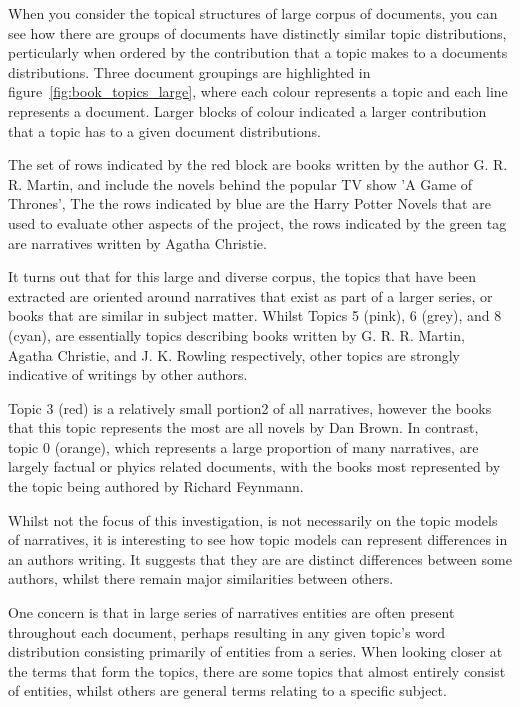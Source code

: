 \documentclass[10pt]{report}
\begin{document}
\begin{multicols}{2}
  \columnbreak
  
  When you consider the topical structures of large corpus of documents, you can see how there are  groups of documents have distinctly similar topic distributions, perticularly when ordered by the contribution that a topic makes to a documents distributions. Three document groupings are highlighted in figure~\ref{fig:book_topics_large}, where each colour represents a topic and each line represents a document. Larger blocks of colour indicated a larger contribution that a topic has to a given document distributions.

  The set of rows indicated by the red block are books written by the author G. R. R. Martin, and include the novels behind the popular TV show 'A Game of Thrones', The the rows indicated by blue are the Harry Potter Novels that are used to evaluate other aspects of the project, the rows indicated by the green tag are narratives written by Agatha Christie.

It turns out that for this large and diverse corpus, the topics that have been extracted are oriented around narratives that exist as part of a larger series, or books that are similar in subject matter. Whilst Topics 5 (pink), 6 (grey), and 8 (cyan), are essentially topics describing books written by G. R. R. Martin, Agatha Christie, and J. K. Rowling respectively, other topics are strongly indicative of writings by other authors.
\end{multicols}
 

Topic 3 (red) is a relatively small portion2 of all narratives, however the books that this topic represents the most are all novels by Dan Brown. In contrast, topic 0 (orange), which represents a large proportion of many narratives, are largely factual or phyics related documents, with the books most represented by the topic being authored by Richard Feynmann.

Whilst not the focus of this investigation, is not necessarily on the topic models of narratives, it is interesting to see how topic models can represent differences in an authors writing. It suggests that they are are distinct differences between some authors, whilst there remain major similarities between others.

One concern is that in large series of narratives entities are often present throughout each document, perhaps resulting in any given topic's word distribution consisting primarily of entities from a series. When looking closer at the terms that form the topics, there are some topics that almost entirely consist of entities, whilst others are general terms relating to a specific subject.
\end{document}
